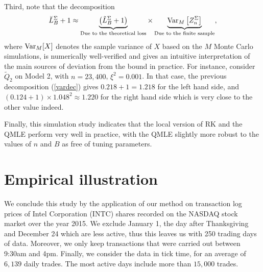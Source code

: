 \documentclass[11pt]{article}
\numberwithin{equation}{section}
\theoremstyle{plain}
\theoremstyle{remark}
\begin{document}
\smallskip
Third, note that the decomposition 
 \begin{eqnarray}
 \label{vardec}
\breve{L}_B^{\Sigma} + 1 \approx \underbrace{\left( \tilde{L}_B^{\Sigma} +1 \right)}_{\textnormal{Due to the theoretical loss}} \times \underbrace{\textnormal{Var}_M\left[Z_n^\Sigma\right]}_{\textnormal{Due to the finite sample}},
\end{eqnarray}
where $\textnormal{Var}_M [X]$ denotes the sample variance of $X$ based on the $M$ Monte Carlo simulations, is numerically well-verified and gives an intuitive interpretation of the main sources of deviation from the bound in practice. For instance, consider $\tilde{Q}_2$ on Model 2, with $n = 23,400$, $\xi^2 = 0.001$. In that case, the previous decomposition (\ref{vardec}) gives $0.218 + 1 = 1.218 $ for the left hand side, and $(0.124 +1) \times 1.048^2 \approx 1.220 $ for the right hand side which is very close to the other value indeed.  

\smallskip
Finally, this simulation study indicates that the local version of RK and the QMLE perform very well in practice, with the QMLE slightly more robust to the values of $n$ and $B$ as free of tuning parameters. 

\section{Empirical illustration} \label{empiricalIllustration}

We conclude this study by the application of our method on transaction log prices of Intel Corporation (INTC) shares recorded on the NASDAQ stock market over the year 2015. We exclude January 1, the day after Thanksgiving and December 24 which are less active, thus this leaves us with 250 trading days of data. Moreover, we only keep transactions that were carried out between 9:30am and 4pm. Finally, we consider the data in tick time, for an average of $6,139$ daily trades. The most active days include more than $15,000$ trades.
\end{document}
